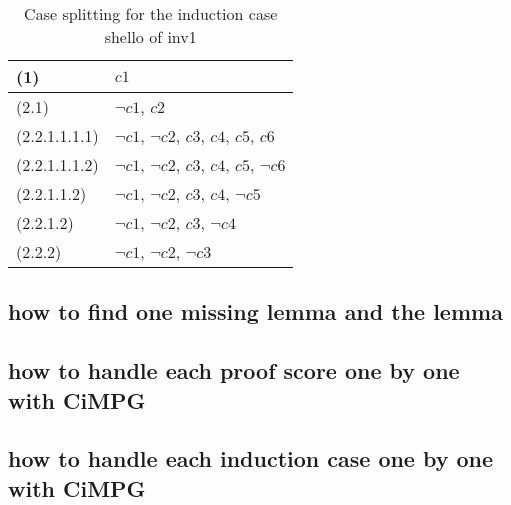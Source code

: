 \documentclass[a4paper,fleqn]{cas-dc}
\begin{document}

\noindent
\begin{table}[]
	\begin{tabular}{l|l}
		\hline
		(1)           & $c1$                                                                     \\ \hline
		(2.1)         & $\neg c1$, $c2$                                                       \\ \hline
		(2.2.1.1.1.1) & $\neg c1$, $\neg c2$, $c3$, $c4$, $c5$, $c6$  \\ \hline
		(2.2.1.1.1.2) & $\neg c1$, $\neg c2$, $c3$, $c4$, $c5$, $\neg c6$ \\ \hline
		(2.2.1.1.2)   & $\neg c1$, $\neg c2$, $c3$, $c4$, $\neg c5$              \\ \hline
		(2.2.1.2)     & $\neg c1$, $\neg c2$, $c3$, $\neg c4$                           \\ \hline
		(2.2.2)       & $\neg c1$, $\neg c2$, $\neg c3$                                        \\ \hline
	\end{tabular}
\caption{Case splitting for the induction case shello of inv1}
\label{fig-cs-inv1}
\end{table}

\subsection{how to find one missing lemma and the lemma}
\subsection{how to handle each proof score one by one with CiMPG}
\subsection{how to handle each induction case one by one with CiMPG}
\end{document}
